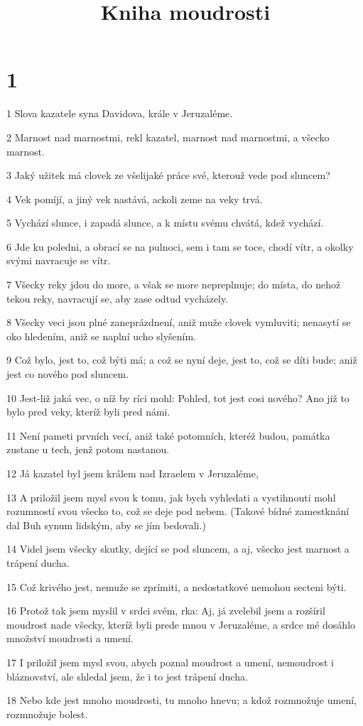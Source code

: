 

\title{Kniha moudrosti}

\chapter{1}

\par 1 Slova kazatele syna Davidova, krále v Jeruzaléme.
\par 2 Marnost nad marnostmi, rekl kazatel, marnost nad marnostmi, a všecko marnost.
\par 3 Jaký užitek má clovek ze všelijaké práce své, kterouž vede pod sluncem?
\par 4 Vek pomíjí, a jiný vek nastává, ackoli zeme na veky trvá.
\par 5 Vychází slunce, i zapadá slunce, a k místu svému chvátá, kdež vychází.
\par 6 Jde ku poledni, a obrací se na pulnoci, sem i tam se toce, chodí vítr, a okolky svými navracuje se vítr.
\par 7 Všecky reky jdou do more, a však se more nepreplnuje; do místa, do nehož tekou reky, navracují se, aby zase odtud vycházely.
\par 8 Všecky veci jsou plné zaneprázdnení, aniž muže clovek vymluviti; nenasytí se oko hledením, aniž se naplní ucho slyšením.
\par 9 Což bylo, jest to, což býti má; a což se nyní deje, jest to, což se díti bude; aniž jest co nového pod sluncem.
\par 10 Jest-liž jaká vec, o níž by ríci mohl: Pohled, tot jest cosi nového? Ano již to bylo pred veky, kteríž byli pred námi.
\par 11 Není pameti prvních vecí, aniž také potomních, kteréž budou, památka zustane u tech, jenž potom nastanou.
\par 12 Já kazatel byl jsem králem nad Izraelem v Jeruzaléme,
\par 13 A priložil jsem mysl svou k tomu, jak bych vyhledati a vystihnouti mohl rozumností svou všecko to, což se deje pod nebem. (Takové bídné zamestknání dal Buh synum lidským, aby se jím bedovali.)
\par 14 Videl jsem všecky skutky, dející se pod sluncem, a aj, všecko jest marnost a trápení ducha.
\par 15 Což krivého jest, nemuže se zprímiti, a nedostatkové nemohou secteni býti.
\par 16 Protož tak jsem myslil v srdci svém, rka: Aj, já zvelebil jsem a rozšíril moudrost nade všecky, kteríž byli prede mnou v Jeruzaléme, a srdce mé dosáhlo množství moudrosti a umení.
\par 17 I priložil jsem mysl svou, abych poznal moudrost a umení, nemoudrost i bláznovství, ale shledal jsem, že i to jest trápení ducha.
\par 18 Nebo kde jest mnoho moudrosti, tu mnoho hnevu; a kdož rozmnožuje umení, rozmnožuje bolest.


